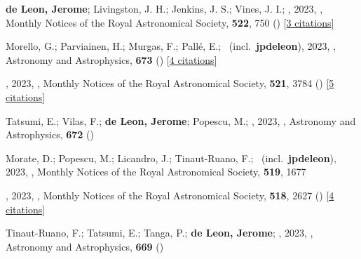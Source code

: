 \item[{\color{numcolor}\scriptsize63}] \textbf{de Leon, Jerome}; Livingston, J. H.; Jenkins, J. S.; Vines, J. I.; \etal, 2023, , Monthly Notices of the Royal Astronomical Society, \textbf{522}, 750 () [\href{https://ui.adsabs.harvard.edu/abs/2023MNRAS.522..750D}{3 citations}]

\item[{\color{numcolor}\scriptsize62}] Morello, G.; Parviainen, H.; Murgas, F.; Pall{\'e}, E.; \etal\ (incl.\ \textbf{jpdeleon}), 2023, , Astronomy and Astrophysics, \textbf{673} () [\href{https://ui.adsabs.harvard.edu/abs/2023A&A...673A..32M}{4 citations}]

\item[{\color{numcolor}\scriptsize61}] , 2023, , Monthly Notices of the Royal Astronomical Society, \textbf{521}, 3784 () [\href{https://ui.adsabs.harvard.edu/abs/2023MNRAS.521.3784L}{5 citations}]

\item[{\color{numcolor}\scriptsize60}] Tatsumi, E.; Vilas, F.; \textbf{de Leon, Jerome}; Popescu, M.; \etal, 2023, , Astronomy and Astrophysics, \textbf{672} ()

\item[{\color{numcolor}\scriptsize59}] Morate, D.; Popescu, M.; Licandro, J.; Tinaut-Ruano, F.; \etal\ (incl.\ \textbf{jpdeleon}), 2023, , Monthly Notices of the Royal Astronomical Society, \textbf{519}, 1677

\item[{\color{numcolor}\scriptsize58}] , 2023, , Monthly Notices of the Royal Astronomical Society, \textbf{518}, 2627 () [\href{https://ui.adsabs.harvard.edu/abs/2023MNRAS.518.2627V}{4 citations}]

\item[{\color{numcolor}\scriptsize57}] Tinaut-Ruano, F.; Tatsumi, E.; Tanga, P.; \textbf{de Leon, Jerome}; \etal, 2023, , Astronomy and Astrophysics, \textbf{669} ()

